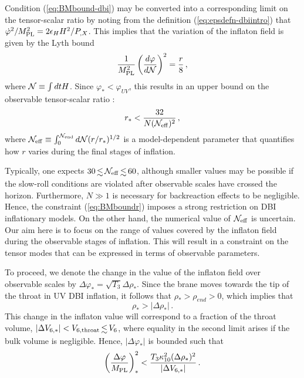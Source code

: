 Condition (\ref{eq:BMbound-dbi}) may be converted into a 
corresponding limit on the tensor-scalar ratio by noting from 
the definition (\ref{eq:epsdefn-dbiintro})
that $\dot{\varphi}^2 /M_{\mathrm{PL}}^2 = 2\epsilon_H H^2/P_{,X}$.
This implies that the variation of the inflaton field 
is given by the Lyth bound 
\cite{lyth,bmpaper}
% 
\begin{equation}
\label{eq:rtheory}
\frac{1}{M_{\mathrm{PL}}^2} \left( \frac{d\varphi}{d \mathcal{N}} \right)^2 =
\frac{r}{8} \,,
\end{equation}
% 
where $\mathcal{N} \equiv \int dt H$. 
Since $\varphi_* < \varphi_{UV}$, this 
results in an upper bound on the observable tensor-scalar ratio
\cite{bmpaper}: 
% 
\begin{equation}
\label{eq:BMboundr}
r_*  < \frac{32}{N (\mathcal{N}_\mathrm{eff})^2} \,,
\end{equation}
% 
where $\mathcal{N}_\mathrm{eff} \equiv 
\int^{{\cal{N}}_{\mathrm{end}}}_0 d \mathcal{N} (r/r_*)^{1/2}$ 
is a model-dependent parameter that quantifies 
how $r$ varies during the final stages of inflation.  

Typically, one expects $30 \, \lsim \, {\Neff} 
\, \lsim \, 60$, 
although smaller values may be possible if the slow-roll conditions are 
violated after observable scales have crossed the horizon. 
Furthermore, $N \gg 1$ is necessary 
for backreaction effects to be negligible. 
 Hence, the constraint (\ref{eq:BMboundr}) 
imposes a strong restriction on DBI inflationary models. 
On the other hand, the numerical value 
of $\mathcal{N}_\mathrm{eff}$ is uncertain.  
Our aim here is to focus on the range of values covered by the 
inflaton field during the observable stages of inflation. 
This will result in a constraint on the tensor modes that 
can be expressed in terms of observable parameters.  


To proceed, we denote the change in the value of the inflaton field over 
observable scales by 
$\Delta  \varphi _{*} = \sqrt{T_3} \Delta \rho_{*}$. 
Since the brane moves towards the tip of the throat in 
UV DBI inflation, it follows that $\rho_{*} > \rho_{end} >0$, which 
implies that  
% 
\begin{equation}
\label{eq:importantbound}
\rho_{*} > |\Delta \rho _{*}| \,.
\end{equation}
% 
This change in the inflaton value will correspond 
to a fraction of the throat volume, 
$| \Delta V _{6,*}|  < {V_{6,\mathrm{throat}}} \, \lsim \, {V_6} $,
where equality in the second limit arises if
the bulk volume is negligible. Hence, 
$| \Delta \varphi_* |$ is bounded such that  
% 
\begin{equation}
\label{eq:halfwayconstraint}
\left( \frac{\Delta \varphi}{M_{\mathrm{PL}}} \right)^2_{*} < 
\frac{T_3 \kappa_{10}^2 (\Delta \rho_{*})^2}{|\Delta V_{6,*}|} \,.
\end{equation}
%  


